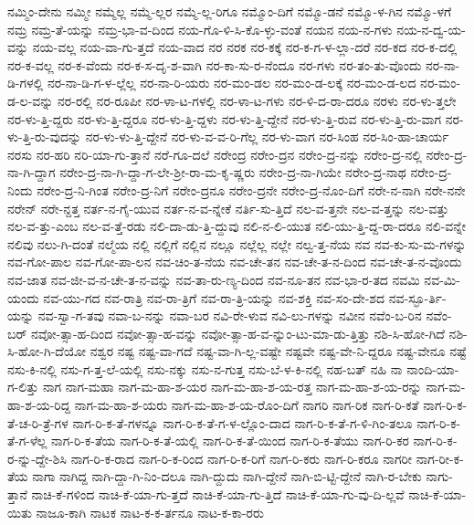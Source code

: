 {ನಮ್ಮಿಂ-ದೇನು
ನಮ್ಮೀ
ನಮ್ಮೆಲ್ಲ
ನಮ್ಮೆ-ಲ್ಲರ
ನಮ್ಮೆ-ಲ್ಲ-ರಿಗೂ
ನಮ್ಮೊಂ-ದಿಗೆ
ನಮ್ಮೊ-ಡನೆ
ನಮ್ಮೊ-ಳ-ಗಿನ
ನಮ್ಮೊ-ಳಗೆ
ನಮ್ರ
ನಮ್ರ-ತೆ-ಯನ್ನು
ನಮ್ರ-ಭಾ-ವ-ದಿಂದ
ನಯ-ಗೊ-ಳಿ-ಸಿ-ಕೊ-ಳ್ಳು-ವಂತೆ
ನಯನ
ನಯ-ನ-ಗಳು
ನಯ-ನ-ದ್ವ-ಯ-ವನ್ನು
ನಯ-ವಲ್ಲ
ನಯ-ವಾ-ಗು-ತ್ತದೆ
ನಯ-ವಾದ
ನರ
ನರಕ
ನರ-ಕಕ್ಕೆ
ನರ-ಕ-ಗ-ಳ-ಲ್ಲಾ-ದರೆ
ನರ-ಕದ
ನರ-ಕ-ದಲ್ಲಿ
ನರ-ಕ-ವಲ್ಲ
ನರ-ಕ-ವೆಂದು
ನರ-ಕ-ಸ-ದೃ-ಶ-ವಾಗಿ
ನರ-ಕಾ-ಸು-ರ-ನೆಂದೂ
ನರ-ಗಳು
ನರ-ತಂ-ತು-ವೊಂದು
ನರ-ನಾ-ಡಿ-ಗಳಲ್ಲಿ
ನರ-ನಾ-ಡಿ-ಗ-ಳ-ಲ್ಲೆಲ್ಲ
ನರ-ನಾ-ರಿ-ಯರು
ನರ-ಮಂ-ಡಲ
ನರ-ಮಂ-ಡ-ಲಕ್ಕೆ
ನರ-ಮಂ-ಡ-ಲದ
ನರ-ಮಂ-ಡ-ಲ-ವನ್ನು
ನರ-ರಲ್ಲಿ
ನರ-ರೂಪೀ
ನರ-ಳಾ-ಟ-ಗಳಲ್ಲಿ
ನರ-ಳಾ-ಟ-ಗಳು
ನರ-ಳಿ-ದ-ರಾ-ದರೂ
ನರಳು
ನರ-ಳು-ತ್ತಲೇ
ನರ-ಳು-ತ್ತಿ-ದ್ದರು
ನರ-ಳು-ತ್ತಿ-ದ್ದರೂ
ನರ-ಳು-ತ್ತಿ-ದ್ದಳು
ನರ-ಳು-ತ್ತಿ-ದ್ದೇನೆ
ನರ-ಳು-ತ್ತಿ-ರುವ
ನರ-ಳು-ತ್ತಿ-ರು-ವಾಗ
ನರ-ಳು-ತ್ತಿ-ರು-ವುದನ್ನು
ನರ-ಳು-ಳು-ತ್ತಿ-ದ್ದೇನೆ
ನರ-ಳು-ವ-ವ-ರಿ-ಗೆಲ್ಲ
ನರ-ಳು-ವಾಗ
ನರ-ಸಿಂಹ
ನರ-ಸಿಂ-ಹಾ-ಚಾರ್ಯ
ನರಸು
ನರ-ಹರಿ
ನರಿ-ಯಾ-ಗು-ತ್ತಾನೆ
ನರೆ-ಗೂ-ದಲೆ
ನರೇಂದ್ರ
ನರೇಂ-ದ್ರನ
ನರೇಂ-ದ್ರ-ನನ್ನು
ನರೇಂ-ದ್ರ-ನಲ್ಲಿ
ನರೇಂ-ದ್ರ-ನಾ-ಗಿ-ದ್ದಾಗ
ನರೇಂ-ದ್ರ-ನಾ-ಗಿ-ದ್ದಾ-ಗ-ಲೇ-ಶ್ರೀ-ರಾ-ಮ-ಕೃ-ಷ್ಣರು
ನರೇಂ-ದ್ರ-ನಾ-ಗಿಯೇ
ನರೇಂ-ದ್ರ-ನಾಥ
ನರೇಂ-ದ್ರ-ನಿಂದು
ನರೇಂ-ದ್ರ-ನಿ-ಗಿಂತ
ನರೇಂ-ದ್ರ-ನಿಗೆ
ನರೇಂ-ದ್ರನೂ
ನರೇಂ-ದ್ರನೇ
ನರೇಂ-ದ್ರ-ನೊಂ-ದಿಗೆ
ನರೇ-ನ-ನಾಗಿ
ನರೇ-ನನೇ
ನರೇನ್
ನರೇ-ನ್ದತ್ತ
ನರ್ತ-ನ-ಗೈ-ಯುವ
ನರ್ತ-ನ-ವ-ನ್ನೇಕೆ
ನರ್ತಿ-ಸು-ತ್ತಿದೆ
ನಲ-ವ-ತ್ತನೇ
ನಲ-ವ-ತ್ತನ್ನು
ನಲ-ವತ್ತು
ನಲ-ವ-ತ್ತು-ಎಂಬ
ನಲ-ವ-ತ್ತೆ-ರಡು
ನಲಿ-ದಾ-ಡು-ತ್ತಿ-ದ್ದುವು
ನಲಿ-ನ-ಲಿ-ಯುತ
ನಲಿ-ಯು-ತ್ತಿ-ದ್ದ-ರಾ-ದರೂ
ನಲಿ-ವನ್ನೇ
ನಲಿವು
ನಲು-ಗಿ-ದಂತೆ
ನಲ್ಮೆಯ
ನಲ್ಲಿ
ನಲ್ಲಿಗೆ
ನಲ್ಲಿನ
ನಲ್ಲೂ
ನಲ್ಲೆಲ್ಲ
ನಲ್ಲೇ
ನಲ್ವ-ತ್ತ-ನೆಯ
ನವ
ನವ-ಕು-ಸು-ಮ-ಗಳನ್ನು
ನವ-ಗೋ-ಪಾಲ
ನವ-ಗೋ-ಪಾ-ಲನ
ನವ-ಚಿಂ-ತ-ನೆಯ
ನವ-ಚೇ-ತನ
ನವ-ಚೇ-ತ-ನ-ದಿಂದ
ನವ-ಚೇ-ತ-ನ-ವೊಂದು
ನವ-ಜಾತ
ನವ-ಜೀ-ವ-ನ-ಚೇ-ತ-ನ-ವನ್ನು
ನವ-ತಾ-ರು-ಣ್ಯ-ದಿಂದ
ನವ-ನೂ-ತನ
ನವ-ಭಾ-ರ-ತದ
ನವಮಿ
ನವ-ಮಿ-ಯಂದು
ನವ-ಯು-ಗದ
ನವ-ರಾತ್ರಿ
ನವ-ರಾ-ತ್ರಿಗೆ
ನವ-ರಾ-ತ್ರಿ-ಯನ್ನು
ನವ-ಶಕ್ತಿ
ನವ-ಸಂ-ದೇ-ಶದ
ನವ-ಸ್ಫೂ-ರ್ತಿ-ಯನ್ನು
ನವ-ಸ್ವಾ-ಗ-ತವು
ನವಾ-ಬ-ನನ್ನು
ನವಾ-ಬರ
ನವಿ-ರೇ-ಳುವ
ನವಿ-ಲು-ಗಳನ್ನು
ನವೀನ
ನವೆಂ-ಬ-ರಿನ
ನವೆಂ-ಬರ್
ನವೋ-ತ್ಸಾ-ಹ-ದಿಂದ
ನವೋ-ತ್ಸಾ-ಹ-ವನ್ನು
ನವೋ-ತ್ಸಾ-ಹ-ವ-ನ್ನುಂ-ಟು-ಮಾ-ಡು-ತ್ತಿತ್ತು
ನಶಿ-ಸಿ-ಹೋ-ಗಿದೆ
ನಶಿ-ಸಿ-ಹೋ-ಗಿ-ದೆಯೋ
ನಶ್ವರ
ನಷ್ಟ
ನಷ್ಟ-ವಾ-ಗದೆ
ನಷ್ಟ-ವಾ-ಗಿ-ಲ್ಲ-ವಷ್ಟೇ
ನಷ್ಟವೇ
ನಷ್ಟ-ವೇ-ನಿ-ದ್ದರೂ
ನಷ್ಟ-ವೇನೂ
ನಷ್ಟೆ
ನಸು-ಕಿ-ನಲ್ಲಿ
ನಸು-ಗ-ತ್ತ-ಲೆ-ಯಲ್ಲಿ
ನಸು-ನಕ್ಕು
ನಸು-ನ-ಗುತ್ತ
ನಸು-ಬೆ-ಳ-ಕಿ-ನಲ್ಲಿ
ನಹ-ಬತ್
ನಹಿ
ನಾ
ನಾಂದಿ-ಯಾ-ಗ-ಲಿತ್ತು
ನಾಗ
ನಾಗ-ಮಹಾ
ನಾಗ-ಮ-ಹಾ-ಶ-ಯರ
ನಾಗ-ಮ-ಹಾ-ಶ-ಯ-ರತ್ತ
ನಾಗ-ಮ-ಹಾ-ಶ-ಯ-ರನ್ನು
ನಾಗ-ಮ-ಹಾ-ಶ-ಯ-ರಿದ್ದ
ನಾಗ-ಮ-ಹಾ-ಶ-ಯರು
ನಾಗ-ಮ-ಹಾ-ಶ-ಯ-ರೊಂ-ದಿಗೆ
ನಾಗರಿ
ನಾಗ-ರಿಕ
ನಾಗ-ರಿ-ಕತೆ
ನಾಗ-ರಿ-ಕ-ತೆ-ಚ-ರಿ-ತ್ರೆ-ಗಳ
ನಾಗ-ರಿ-ಕ-ತೆ-ಗಳನ್ನೂ
ನಾಗ-ರಿ-ಕ-ತೆ-ಗ-ಳ-ಲ್ಲೊಂ-ದಾದ
ನಾಗ-ರಿ-ಕ-ತೆ-ಗ-ಳಿ-ಗಿಂ-ತಲೂ
ನಾಗ-ರಿ-ಕ-ತೆ-ಗ-ಳೆಲ್ಲ
ನಾಗ-ರಿ-ಕ-ತೆಯ
ನಾಗ-ರಿ-ಕ-ತೆ-ಯಲ್ಲಿ
ನಾಗ-ರಿ-ಕ-ತೆ-ಯಿಂದ
ನಾಗ-ರಿ-ಕ-ತೆಯು
ನಾಗ-ರಿ-ಕರ
ನಾಗ-ರಿ-ಕ-ರ-ನ್ನು-ದ್ದೇ-ಶಿಸಿ
ನಾಗ-ರಿ-ಕ-ರಾದ
ನಾಗ-ರಿ-ಕ-ರಿಂದ
ನಾಗ-ರಿ-ಕ-ರಿಗೆ
ನಾಗ-ರಿ-ಕರು
ನಾಗ-ರಿ-ಕರೂ
ನಾಗರೀ
ನಾಗ-ರೀ-ಕ-ತೆಯ
ನಾಗಾ
ನಾಗಿದ್ದ
ನಾಗಿ-ದ್ದಾ-ಗಿ-ನಿಂ-ದಲೂ
ನಾಗಿ-ದ್ದುದು
ನಾಗಿ-ದ್ದೇನೆ
ನಾಗಿ-ಬಿ-ಟ್ಟಿ-ದ್ದೇನೆ
ನಾಗಿ-ರ-ಬೇಕು
ನಾಗು-ತ್ತಾನೆ
ನಾಚಿ-ಕೆ-ಗಳಿಂದ
ನಾಚಿ-ಕೆ-ಯಾ-ಗು-ತ್ತದೆ
ನಾಚಿ-ಕೆ-ಯಾ-ಗು-ತ್ತಿದೆ
ನಾಚಿ-ಕೆ-ಯಾ-ಗು-ವು-ದಿ-ಲ್ಲವೆ
ನಾಚಿ-ಕೆ-ಯಾ-ಯಿತು
ನಾಜೂ-ಕಾಗಿ
ನಾಟಕ
ನಾಟ-ಕ-ಕ-ರ್ತನೂ
ನಾಟ-ಕ-ಕಾ-ರರು
}
